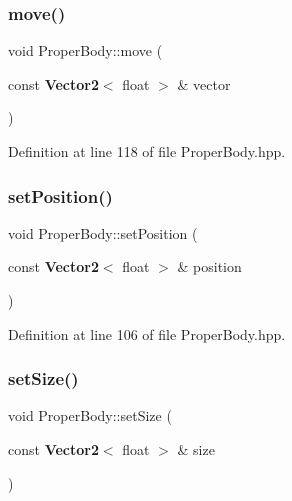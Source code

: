 \mbox{\label{class_proper_body_a8ffa871e415da0b558a5776f8aaca08e}} 
\subsubsection{move()}
{\footnotesize\ttfamily void Proper\+Body\+::move (\begin{DoxyParamCaption}\item[{const \textbf{ Vector2}$<$ float $>$ \&}]{vector }\end{DoxyParamCaption})\hspace{0.3cm}{\ttfamily [inline]}}



Definition at line 118 of file Proper\+Body.\+hpp.

\mbox{\label{class_proper_body_aef60ac67f44eb2966d6accb12584f511}} 
\subsubsection{set\+Position()}
{\footnotesize\ttfamily void Proper\+Body\+::set\+Position (\begin{DoxyParamCaption}\item[{const \textbf{ Vector2}$<$ float $>$ \&}]{position }\end{DoxyParamCaption})\hspace{0.3cm}{\ttfamily [inline]}}



Definition at line 106 of file Proper\+Body.\+hpp.

\mbox{\label{class_proper_body_aabca090eeafb4400b7b8b2a5721fb010}} 
\subsubsection{set\+Size()}
{\footnotesize\ttfamily void Proper\+Body\+::set\+Size (\begin{DoxyParamCaption}\item[{const \textbf{ Vector2}$<$ float $>$ \&}]{size }\end{DoxyParamCaption})\hspace{0.3cm}{\ttfamily [inline]}}



